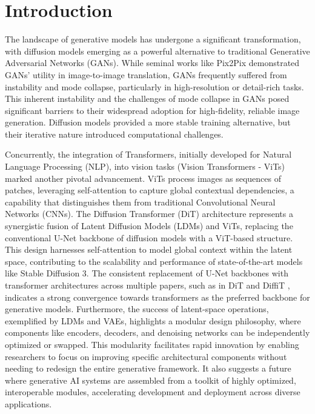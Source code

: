 \documentclass[a4paper]{article}
\begin{document}
\section{Introduction}
The landscape of generative models has undergone a significant transformation, with diffusion models emerging as a powerful alternative to traditional Generative Adversarial Networks (GANs). While seminal works like Pix2Pix demonstrated GANs' utility in image-to-image translation, GANs frequently suffered from instability and mode collapse, particularly in high-resolution or detail-rich tasks. This inherent instability and the challenges of mode collapse in GANs posed significant barriers to their widespread adoption for high-fidelity, reliable image generation. Diffusion models provided a more stable training alternative, but their iterative nature introduced computational challenges.

Concurrently, the integration of Transformers, initially developed for Natural Language Processing (NLP), into vision tasks (Vision Transformers - ViTs) marked another pivotal advancement. ViTs process images as sequences of patches, leveraging self-attention to capture global contextual dependencies, a capability that distinguishes them from traditional Convolutional Neural Networks (CNNs). The Diffusion Transformer (DiT) architecture represents a synergistic fusion of Latent Diffusion Models (LDMs) and ViTs, replacing the conventional U-Net backbone of diffusion models with a ViT-based structure. This design harnesses self-attention to model global context within the latent space, contributing to the scalability and performance of state-of-the-art models like Stable Diffusion 3. The consistent replacement of U-Net backbones with transformer architectures across multiple papers, such as in DiT and DiffiT \cite{Hatamizadeh2023DiffiT}, indicates a strong convergence towards transformers as the preferred backbone for generative models. Furthermore, the success of latent-space operations, exemplified by LDMs and VAEs, highlights a modular design philosophy, where components like encoders, decoders, and denoising networks can be independently optimized or swapped. This modularity facilitates rapid innovation by enabling researchers to focus on improving specific architectural components without needing to redesign the entire generative framework. It also suggests a future where generative AI systems are assembled from a toolkit of highly optimized, interoperable modules, accelerating development and deployment across diverse applications.
\end{document}

